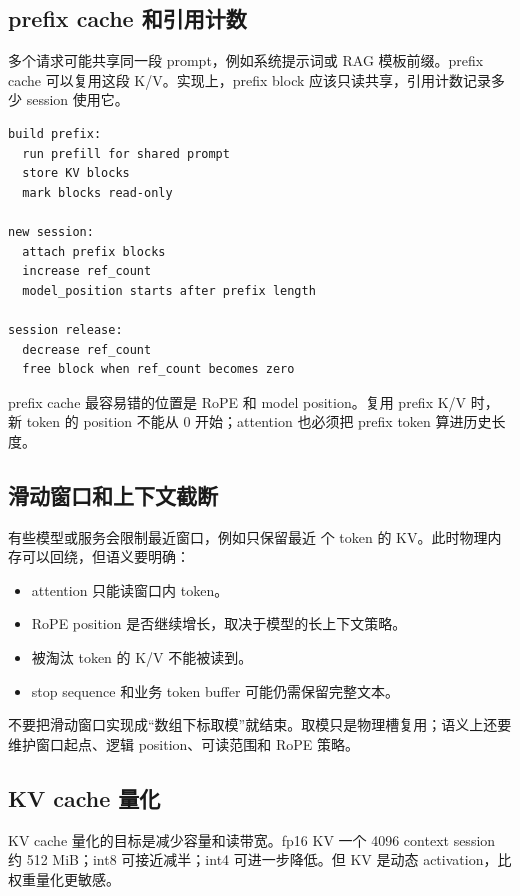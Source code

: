 \subsection{prefix cache 和引用计数}

多个请求可能共享同一段 prompt，例如系统提示词或 RAG 模板前缀。prefix cache 可以复用这段 K/V。实现上，prefix block 应该只读共享，引用计数记录多少 session 使用它。

\begin{lstlisting}[numbers=none,caption={prefix cache 生命周期}]
build prefix:
  run prefill for shared prompt
  store KV blocks
  mark blocks read-only

new session:
  attach prefix blocks
  increase ref_count
  model_position starts after prefix length

session release:
  decrease ref_count
  free block when ref_count becomes zero
\end{lstlisting}

prefix cache 最容易错的位置是 RoPE 和 model position。复用 prefix K/V 时，新 token 的 position 不能从 0 开始；attention 也必须把 prefix token 算进历史长度。

\subsection{滑动窗口和上下文截断}

有些模型或服务会限制最近窗口，例如只保留最近  个 token 的 KV。此时物理内存可以回绕，但语义要明确：

\begin{itemize}
  \item attention 只能读窗口内 token。
  \item RoPE position 是否继续增长，取决于模型的长上下文策略。
  \item 被淘汰 token 的 K/V 不能被读到。
  \item stop sequence 和业务 token buffer 可能仍需保留完整文本。
\end{itemize}

不要把滑动窗口实现成“数组下标取模”就结束。取模只是物理槽复用；语义上还要维护窗口起点、逻辑 position、可读范围和 RoPE 策略。

\subsection{KV cache 量化}

KV cache 量化的目标是减少容量和读带宽。fp16 KV 一个 4096 context session 约 512 MiB；int8 可接近减半；int4 可进一步降低。但 KV 是动态 activation，比权重量化更敏感。

